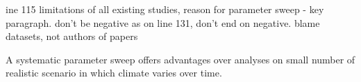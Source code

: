 \documentclass[preprint, 5p, times, twocolumn]{elsarticle}
\begin{document}


ine 115  limitations of all existing studies, reason for parameter sweep - key paragraph. don't be negative as on line 131, don't end on negative. blame datasets, not authors of papers

A systematic parameter sweep offers advantages over analyses on small number of realistic scenario in which climate varies over time. 
\end{document}
